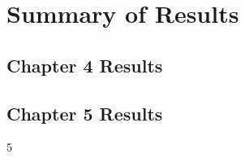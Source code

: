 
\chapter{Summary of Results} %

\label{AppendixC} %



\section{Chapter 4 Results}



\newpage


\newpage


\newpage


\newpage


\newpage


\newpage
\section{Chapter 5 Results}









5\newpage


